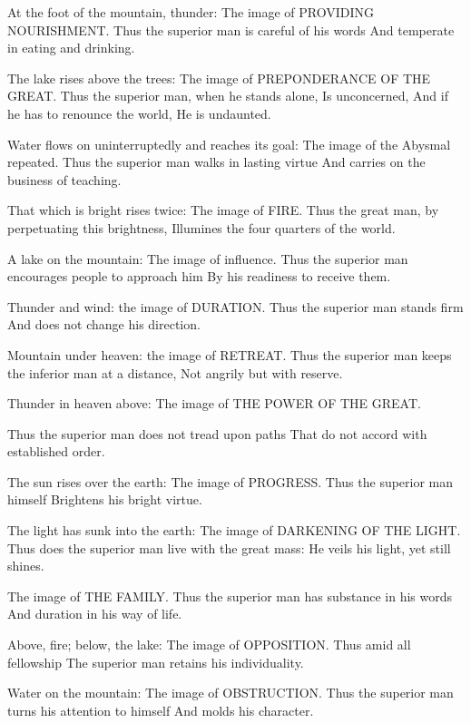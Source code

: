 {At the foot of the mountain, thunder:
 The image of PROVIDING
 NOURISHMENT.
 Thus the superior man is careful of his words
 And temperate in eating and drinking.}

{The lake rises above the trees:
 The image of PREPONDERANCE OF
 THE GREAT.
 Thus the superior man, when he stands alone,
 Is unconcerned,
 And if he has to renounce the world,
 He is undaunted.}

{Water flows on uninterruptedly and reaches its goal:
 The image of the Abysmal repeated.
 Thus the superior man walks in lasting virtue
 And carries on the business of teaching.}

{That which is bright rises twice:
 The image of FIRE.
 Thus the great man, by perpetuating this brightness,
 Illumines the four quarters of the world.}

{A lake on the mountain:
 The image of influence.
 Thus the superior man encourages people to approach him
 By his readiness to receive them.}

{Thunder and wind: the image of
 DURATION.
 Thus the superior man stands firm
 And does not change his direction.}

{Mountain under heaven: the image of
 RETREAT.
 Thus the superior man keeps the inferior man at a distance,
 Not angrily but with reserve.}

{Thunder in heaven above:
 The image of THE POWER OF THE
 GREAT.}

{Thus the superior man does not tread upon paths
 That do not accord with established order.}

{The sun rises over the earth:
 The image of PROGRESS.
 Thus the superior man himself
 Brightens his bright virtue.}

{The light has sunk into the earth:
 The image of DARKENING OF THE LIGHT.
 Thus does the superior man live with the great mass:
 He veils his light, yet still shines.}

{The image of THE FAMILY.
 Thus the superior man has substance in his words
 And duration in his way of life.}

{Above, fire; below, the lake:
 The image of OPPOSITION.
 Thus amid all fellowship
 The superior man retains his individuality.}

{Water on the mountain:
 The image of OBSTRUCTION.
 Thus the superior man turns his attention to himself
 And molds his character.}


